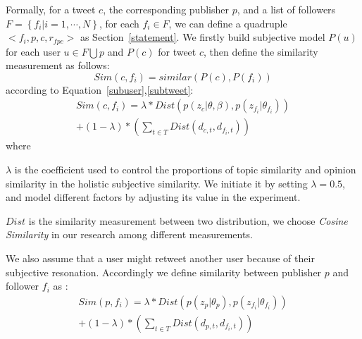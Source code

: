 \documentclass{acm_proc_article-sp}
\begin{document}
Formally, for a tweet $ c $, the corresponding publisher $ p $, and a list of followers $ F= \left\lbrace f_{i} \vert i=1, \cdots, N \right\rbrace  $, for each $ f_{i} \in F $, we can define a quadruple $ < f_{i}, p, c, r_{fpc} >  $ as Section~\ref{statement}.
We firstly build subjective model $ P\left( u \right)  $ for each user $ u \in F \bigcup p $ and $ P\left( c \right)  $ for tweet $ c $, then define the similarity measurement as follows:
\begin{equation}
Sim\left( c,f_{i} \right) = similar\left( P\left( c \right), P\left( f_{i} \right) \right)
\end{equation}
according to Equation~\ref{subuser},\ref{subtweet}:
\begin{equation}
\label{tweetfollower}
\begin{split}
Sim\left( c,f_{i} \right) = \lambda \ast Dist\left( p\left( z_{c} \vert \theta, \beta \right), p\left( z_{f_{i}} \vert \theta_{f_{i}} \right) \right) \\
+\left(1-\lambda \right) \ast \left( \sum_{t \in T} Dist \left( d_{c,t}, d_{f_{i}, t} \right)  \right)
\end{split}
\end{equation}
where 
\begin{itemize*}
\item $ \lambda $ is the coefficient used to control the proportions of topic similarity and opinion similarity in the holistic subjective similarity. We initiate it by setting $ \lambda =0.5 $, and model different factors by adjusting its value in the experiment. 
\item $ Dist $ is the similarity measurement between two distribution, we choose \emph{Cosine Similarity } in our research among different measurements.
\end{itemize*}
We also assume that a user might retweet another user because of their subjective resonation. Accordingly we define similarity between publisher $ p $ and follower $ f_{i} $ as :
\begin{equation}
\label{pubfollower}
\begin{split}
Sim\left( p,f_{i} \right) = \lambda \ast Dist\left( p\left( z_{p} \vert \theta_{p} \right), p\left( z_{f_{i}} \vert \theta_{f_{i}} \right) \right) \\
+\left(1-\lambda \right) \ast \left( \sum_{t \in T} Dist \left( d_{p,t}, d_{f_{i}, t} \right)  \right)
\end{split}
\end{equation}
\end{document}
